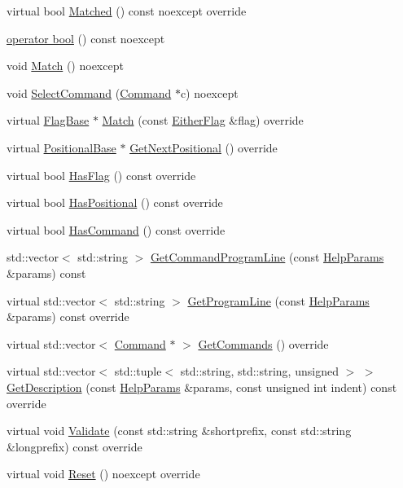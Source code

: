 \begin{DoxyCompactItemize}
\item 
virtual bool \hyperlink{classargs_1_1_command_aebb9c512301e7f0c49689ed92568ef6e}{Matched} () const noexcept override
\item 
\hyperlink{classargs_1_1_command_a31dfb353bcab4047be1dee1d915dbc8f}{operator bool} () const noexcept
\item 
void \hyperlink{classargs_1_1_command_a9a7ba5cc30681d7f5316d533637a21ba}{Match} () noexcept
\item 
void \hyperlink{classargs_1_1_command_a6c78467ab5b58df69073da9878cc783c}{Select\+Command} (\hyperlink{classargs_1_1_command}{Command} $\ast$c) noexcept
\item 
virtual \hyperlink{classargs_1_1_flag_base}{Flag\+Base} $\ast$ \hyperlink{classargs_1_1_command_ace018e92977b0e6ec5472cae0166523c}{Match} (const \hyperlink{structargs_1_1_either_flag}{Either\+Flag} \&flag) override
\item 
virtual \hyperlink{classargs_1_1_positional_base}{Positional\+Base} $\ast$ \hyperlink{classargs_1_1_command_a073266d188b3592f745c64567e566f8a}{Get\+Next\+Positional} () override
\item 
virtual bool \hyperlink{classargs_1_1_command_abcf9fafcb1531d3c0ea8a1b3a31c6ba4}{Has\+Flag} () const override
\item 
virtual bool \hyperlink{classargs_1_1_command_a5c430c5f36d678e80420d2f094ac3a4d}{Has\+Positional} () const override
\item 
virtual bool \hyperlink{classargs_1_1_command_aa7117d38f553f127542434f6cafc2697}{Has\+Command} () const override
\item 
std\+::vector$<$ std\+::string $>$ \hyperlink{classargs_1_1_command_aafb4485ab3ff22ee4d52339e098647c6}{Get\+Command\+Program\+Line} (const \hyperlink{structargs_1_1_help_params}{Help\+Params} \&params) const
\item 
virtual std\+::vector$<$ std\+::string $>$ \hyperlink{classargs_1_1_command_a37fbbde216ce232279e04edce12c1245}{Get\+Program\+Line} (const \hyperlink{structargs_1_1_help_params}{Help\+Params} \&params) const override
\item 
virtual std\+::vector$<$ \hyperlink{classargs_1_1_command}{Command} $\ast$ $>$ \hyperlink{classargs_1_1_command_a59511be164aa3a0cc5fbbfb75ca79fec}{Get\+Commands} () override
\item 
virtual std\+::vector$<$ std\+::tuple$<$ std\+::string, std\+::string, unsigned $>$ $>$ \hyperlink{classargs_1_1_command_afdd0a3ea344a4a5672565d1f2f0157f1}{Get\+Description} (const \hyperlink{structargs_1_1_help_params}{Help\+Params} \&params, const unsigned int indent) const override
\item 
virtual void \hyperlink{classargs_1_1_command_ad39b397a91af426f0ecbda9d29d7bbe0}{Validate} (const std\+::string \&shortprefix, const std\+::string \&longprefix) const override
\item 
virtual void \hyperlink{classargs_1_1_command_aa1829501dd4f63ba3551bf85171be83e}{Reset} () noexcept override
\end{DoxyCompactItemize}
